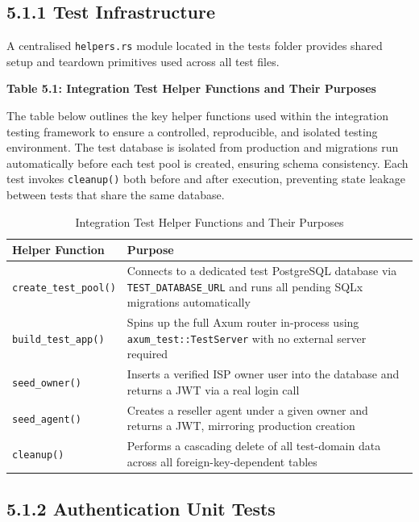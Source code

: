 \documentclass[12pt,a4paper,oneside]{report}
\begin{document}
\subsection{5.1.1 Test Infrastructure}

A centralised \texttt{helpers.rs} module located in the tests folder provides shared setup and teardown primitives used across all test files.

\textbf{Table 5.1: Integration Test Helper Functions and Their Purposes}

\vspace{0.3cm}
The table below outlines the key helper functions used within the integration testing framework to ensure a controlled, reproducible, and isolated testing environment. The test database is isolated from production and migrations run automatically before each test pool is created, ensuring schema consistency. Each test invokes \texttt{cleanup()} both before and after execution, preventing state leakage between tests that share the same database.

\begin{table}[htbp]
  \centering
  \caption{Integration Test Helper Functions and Their Purposes}
  {\small
  \begin{tabular}{|p{3.07cm}|p{10.00cm}|}
    \hline
    \textbf{Helper Function} & \textbf{Purpose} \\
    \hline
    \texttt{create\_test\_pool()} & Connects to a dedicated test PostgreSQL database via \texttt{TEST\_DATABASE\_URL} and runs all pending SQLx migrations automatically \\
    \texttt{build\_test\_app()} & Spins up the full Axum router in-process using \texttt{axum\_test::TestServer} with no external server required \\
    \texttt{seed\_owner()} & Inserts a verified ISP owner user into the database and returns a JWT via a real login call \\
    \texttt{seed\_agent()} & Creates a reseller agent under a given owner and returns a JWT, mirroring production creation \\
    \texttt{cleanup()} & Performs a cascading delete of all test-domain data across all foreign-key-dependent tables \\
    \hline
  \end{tabular}
  }
\end{table}

\subsection{5.1.2 Authentication Unit Tests}
\end{document}
